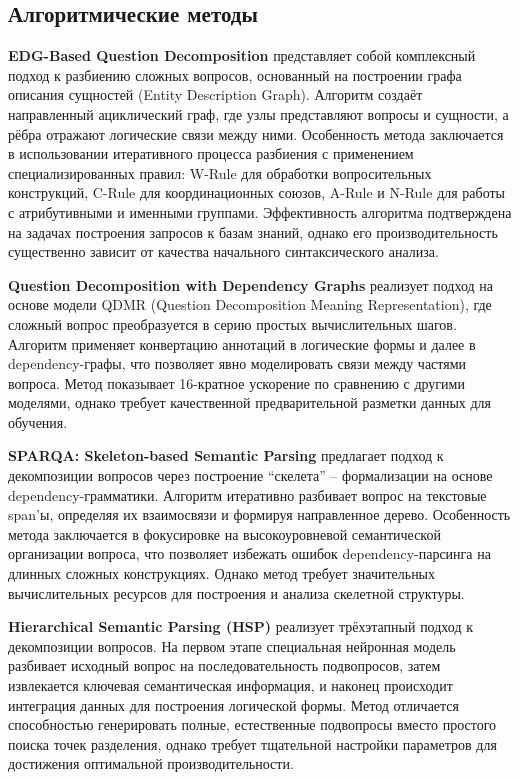 \subsection{Алгоритмические методы}

\textbf{EDG-Based Question Decomposition} представляет собой комплексный подход к разбиению сложных вопросов, основанный на построении графа описания сущностей (Entity Description Graph). Алгоритм создаёт направленный ациклический граф, где узлы представляют вопросы и сущности, а рёбра отражают логические связи между ними. Особенность метода заключается в использовании итеративного процесса разбиения с применением специализированных правил: W-Rule для обработки вопросительных конструкций, C-Rule для координационных союзов, A-Rule и N-Rule для работы с атрибутивными и именными группами. Эффективность алгоритма подтверждена на задачах построения запросов к базам знаний, однако его производительность существенно зависит от качества начального синтаксического анализа. \cite{hu2021edg}

\textbf{Question Decomposition with Dependency Graphs} реализует подход на основе модели QDMR (Question Decomposition Meaning Representation), где сложный вопрос преобразуется в серию простых вычислительных шагов. Алгоритм применяет конвертацию аннотаций в логические формы и далее в dependency-графы, что позволяет явно моделировать связи между частями вопроса. Метод показывает 16-кратное ускорение по сравнению с другими моделями, однако требует качественной предварительной разметки данных для обучения. \cite{hasson2021question}

\textbf{SPARQA: Skeleton-based Semantic Parsing} предлагает подход к декомпозиции вопросов через построение \enquote{скелета} -- формализации на основе dependency-грамматики. Алгоритм итеративно разбивает вопрос на текстовые span'ы, определяя их взаимосвязи и формируя направленное дерево. Особенность метода заключается в фокусировке на высокоуровневой семантической организации вопроса, что позволяет избежать ошибок dependency-парсинга на длинных сложных конструкциях. Однако метод требует значительных вычислительных ресурсов для построения и анализа скелетной структуры. \cite{sun2020sparqa}

\textbf{Hierarchical Semantic Parsing (HSP)} реализует трёхэтапный подход к декомпозиции вопросов. На первом этапе специальная нейронная модель разбивает исходный вопрос на последовательность подвопросов, затем извлекается ключевая семантическая информация, и наконец происходит интеграция данных для построения логической формы. Метод отличается способностью генерировать полные, естественные подвопросы вместо простого поиска точек разделения, однако требует тщательной настройки параметров для достижения оптимальной производительности. \cite{zhang2019complex}

